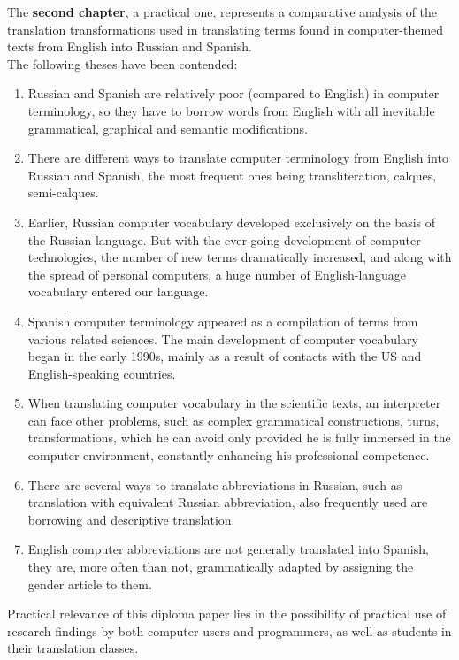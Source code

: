 \documentclass[12pt, a4paper, twoside]{report}
\begin{document}
The \textbf{second chapter}, a practical one, represents a comparative analysis of the translation transformations used in translating terms found in computer-themed texts from English into Russian and Spanish.\\
The following theses have been contended:
\begin{enumerate}
    \item Russian and Spanish are relatively poor (compared to English) in computer terminology, so they have to borrow words from English with all inevitable grammatical, graphical and semantic modifications.
    \item There are different ways to translate computer terminology from English into Russian and Spanish, the most frequent ones being transliteration, calques, semi-calques.
    \item Earlier, Russian computer vocabulary developed exclusively on the basis of the Russian language. But with the ever-going development of computer technologies, the number of new terms dramatically increased, and along with the spread of personal computers, a huge number of English-language vocabulary entered our language.
    \item Spanish computer terminology appeared as a compilation of terms from various related sciences. The main development of computer vocabulary began in the early 1990s, mainly as a result of contacts with the US and English-speaking countries.
    \item When translating computer vocabulary in the scientific texts, an interpreter can face other problems, such as complex grammatical constructions, turns, transformations, which he can avoid only provided he is fully immersed in the computer environment, constantly enhancing his professional competence.
    \item There are several ways to translate abbreviations in Russian, such as transla\-tion with equivalent Russian abbreviation, also frequently used are borrowing and descriptive translation.
    \item English computer abbreviations are not generally translated into Spanish, they are, more often than not, grammatically adapted by assigning the gender article to them.\\
\end{enumerate}

Practical relevance of this diploma paper lies in the possibility of practical use of research findings by both computer users and programmers, as well as students in their translation classes.
\end{document}
